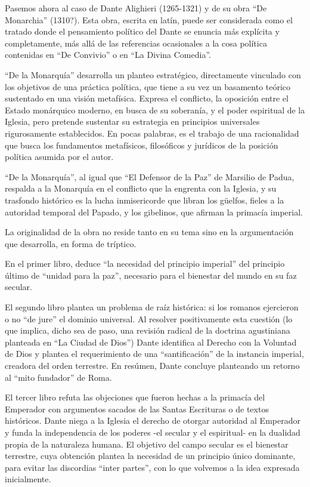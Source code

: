 \documentclass[
]{book}
\begin{document}
Pasemos ahora al caso de Dante Alighieri (1265-1321) y de su obra ``De Monarchia'' (1310?). Esta obra, escrita en latín, puede ser considerada como el tratado donde el pensamiento político del Dante se enuncia más explícita y completamente, más allá de las referencias ocasionales a la cosa política contenidas en ``De Convivio'' o en ``La Divina Comedia''.

``De la Monarquía'' desarrolla un planteo estratégico, directamente vinculado con los objetivos de una práctica política, que tiene a su vez un basamento teórico sustentado en una visión metafísica. Expresa el conflicto, la oposición entre el Estado monárquico moderno, en busca de su soberanía, y el poder espiritual de la Iglesia, pero pretende sustentar su estrategia en principios universales rigurosamente establecidos. En pocas palabras, es el trabajo de una racionalidad que busca los fundamentos metafísicos, filosóficos y jurídicos de la posición política asumida por el autor.

``De la Monarquía'', al igual que ``El Defensor de la Paz'' de Marsilio de Padua, respalda a la Monarquía en el conflicto que la engrenta con la Iglesia, y su trasfondo histórico es la lucha inmisericorde que libran los güelfos, fieles a la autoridad temporal del Papado, y los gibelinos, que afirman la primacía imperial.

La originalidad de la obra no reside tanto en su tema sino en la argumentación que desarrolla, en forma de tríptico.

En el primer libro, deduce ``la necesidad del principio imperial'' del principio último de ``unidad para la paz'', necesario para el bienestar del mundo en su faz secular.

El segundo libro plantea un problema de raíz histórica: si los romanos ejercieron o no ``de jure'' el dominio universal. Al resolver positivamente esta cuestión (lo que implica, dicho sea de paso, una revisión radical de la doctrina agustiniana planteada en ``La Ciudad de Dios'') Dante identifica al Derecho con la Voluntad de Dios y plantea el requerimiento de una ``santificación'' de la instancia imperial, creadora del orden terrestre. En resúmen, Dante concluye planteando un retorno al ``mito fundador'' de Roma.

El tercer libro refuta las objeciones que fueron hechas a la primacía del Emperador con argumentos sacados de las Santas Escrituras o de textos históricos. Dante niega a la Iglesia el derecho de otorgar autoridad al Emperador y funda la independencia de los poderes -el secular y el espiritual- en la dualidad propia de la naturaleza humana. El objetivo del campo secular es el bienestar terrestre, cuya obtención plantea la necesidad de un principio único dominante, para evitar las discordias ``inter partes'', con lo que volvemos a la idea expresada inicialmente.
\end{document}
